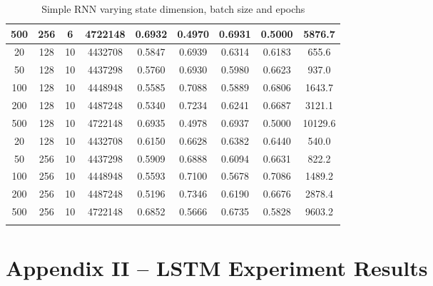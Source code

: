 \documentclass[letterpaper, 10pt]{article}
\begin{document}
\begin{longtable}{c | c | c | c | c | c | c | c | c}
500 & 256 & 6 & 4722148 & 0.6932 & 0.4970 & 0.6931 & 0.5000 & 5876.7 \\
\hline
20 & 128 & 10 & 4432708 & 0.5847 & 0.6939 & 0.6314 & 0.6183 & 655.6 \\
50 & 128 & 10 & 4437298 & 0.5760 & 0.6930 & 0.5980 & 0.6623 & 937.0 \\
100 & 128 & 10 & 4448948 & 0.5585 & 0.7088 & 0.5889 & 0.6806 & 1643.7 \\
200 & 128 & 10 & 4487248 & 0.5340 & 0.7234 & 0.6241 & 0.6687 & 3121.1 \\
500 & 128 & 10 & 4722148 & 0.6935 & 0.4978 & 0.6937 & 0.5000 & 10129.6 \\
20 & 128 & 10 & 4432708 & 0.6150 & 0.6628 & 0.6382 & 0.6440 & 540.0 \\
50 & 256 & 10 & 4437298 & 0.5909 & 0.6888 & 0.6094 & 0.6631 & 822.2 \\
100 & 256 & 10 & 4448948 & 0.5593 & 0.7100 & 0.5678 & 0.7086 & 1489.2 \\
200 & 256 & 10 & 4487248 & 0.5196 & 0.7346 & 0.6190 & 0.6676 & 2878.4 \\
500 & 256 & 10 & 4722148 & 0.6852 & 0.5666 & 0.6735 & 0.5828 & 9603.2 \\
\caption{Simple RNN varying state dimension, batch size and epochs}
\label{tab:fullresultsrnn1}
\end{longtable}

\newpage
\section{Appendix II -- LSTM Experiment Results}
\end{document}
